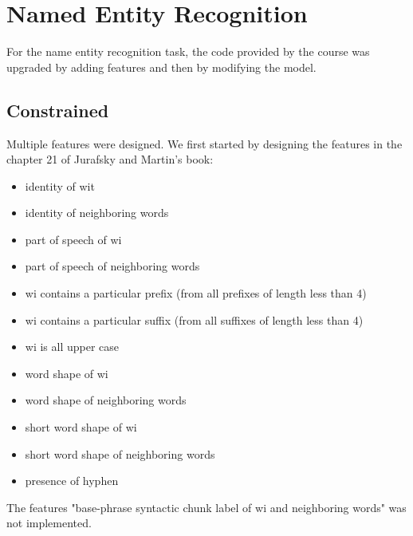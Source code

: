 \documentclass{article}
\begin{document}
\section{Named Entity Recognition}

For the name entity recognition task, the code provided by the course was upgraded by adding features and then by modifying the model.

\subsection{Constrained}

Multiple features were designed. We first started by designing the features in the chapter 21 of Jurafsky and Martin’s book:
\begin{itemize}  
	\item identity of wit
	\item identity of neighboring words
	\item part of speech of wi
	\item part of speech of neighboring words
	\item wi contains a particular prefix (from all prefixes of length less than 4)
	\item wi contains a particular suffix (from all suffixes of length less than 4)
	\item wi is all upper case
	\item word shape of wi
	\item word shape of neighboring words
	\item short word shape of wi
	\item short word shape of neighboring words
	\item presence of hyphen 
\end{itemize}

The features "base-phrase syntactic chunk label of wi and neighboring words" was not implemented.
\end{document}
